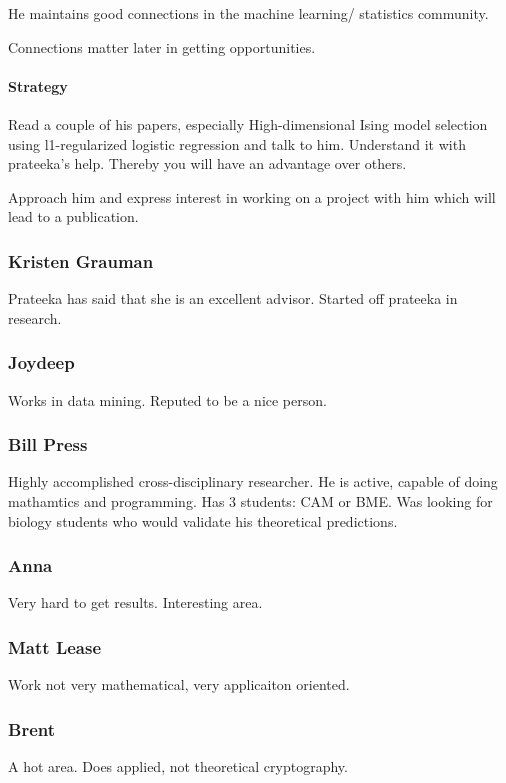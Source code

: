 \documentclass[oneside, article]{memoir}
\begin{document}
He maintains good connections in the machine learning/ statistics community. 

Connections matter later in getting opportunities.

\paragraph*{Strategy}
Read a couple of his papers, especially High-dimensional Ising model selection using l1-regularized logistic regression and talk to him. Understand it with prateeka's help. Thereby you will have an advantage over others.

Approach him and express interest in working on a project with him which will lead to a publication.

\subsubsection{Kristen Grauman}
\subitem Prateeka has said that she is an excellent advisor.
\subitem Started off prateeka in research.

\subsubsection{Joydeep}
Works in data mining. Reputed to be a nice person.

\subsubsection{Bill Press}
Highly accomplished cross-disciplinary researcher. He is active, capable of doing mathamtics and programming. Has 3 students: CAM or BME. Was looking for biology students who would validate his theoretical predictions.

\subsubsection{Anna}
Very hard to get results. Interesting area.

\subsubsection{Matt Lease}
Work not very mathematical, very applicaiton oriented.

\subsubsection{Brent}
A hot area. Does applied, not theoretical cryptography.
\end{document}
